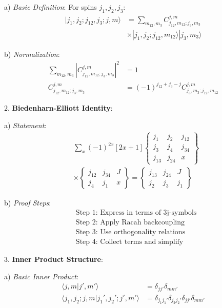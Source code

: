\documentclass[12pt,a4paper]{article}
\begin{document}
   a) \textit{Basic Definition}:
      For spins $j_1, j_2, j_3$:
      \[
      \begin{aligned}
      |j_1,j_2;j_{12},j_3;j,m\rangle &= \sum_{m_{12},m_3} C^{j,m}_{j_{12},m_{12};j_3,m_3} \\
      &\times |j_1,j_2;j_{12},m_{12}\rangle|j_3,m_3\rangle
      \end{aligned}
      \]
   
   b) \textit{Normalization}:
      \[
      \begin{aligned}
      \sum_{m_{12},m_3} |C^{j,m}_{j_{12},m_{12};j_3,m_3}|^2 &= 1 \\
      C^{j,m}_{j_{12},m_{12};j_3,m_3} &= (-1)^{j_{12}+j_3-j}C^{j,m}_{j_3,m_3;j_{12},m_{12}}
      \end{aligned}
      \]

2. \textbf{Biedenharn-Elliott Identity}:
   
   a) \textit{Statement}:
      \[
      \begin{aligned}
      &\sum_{x} (-1)^{2x} [2x+1] 
      \begin{Bmatrix} 
      j_1 & j_2 & j_{12} \\
      j_3 & j_4 & j_{34} \\
      j_{13} & j_{24} & x
      \end{Bmatrix} \\
      &\times \begin{Bmatrix}
      j_{12} & j_{34} & J \\
      j_4 & j_1 & x
      \end{Bmatrix} = 
      \begin{Bmatrix}
      j_{13} & j_{24} & J \\
      j_2 & j_3 & j_1
      \end{Bmatrix}
      \end{aligned}
      \]
   
   b) \textit{Proof Steps}:
      \[
      \begin{aligned}
      &\text{Step 1: Express in terms of 3j-symbols} \\
      &\text{Step 2: Apply Racah backcoupling} \\
      &\text{Step 3: Use orthogonality relations} \\
      &\text{Step 4: Collect terms and simplify}
      \end{aligned}
      \]

3. \textbf{Inner Product Structure}:
   
   a) \textit{Basic Inner Product}:
      \[
      \begin{aligned}
      \langle j,m|j',m'\rangle &= \delta_{jj'}\delta_{mm'} \\
      \langle j_1,j_2;j,m|j_1',j_2';j',m'\rangle &= \delta_{j_1j_1'}\delta_{j_2j_2'}\delta_{jj'}\delta_{mm'}
      \end{aligned}
      \]
   
\end{document}
